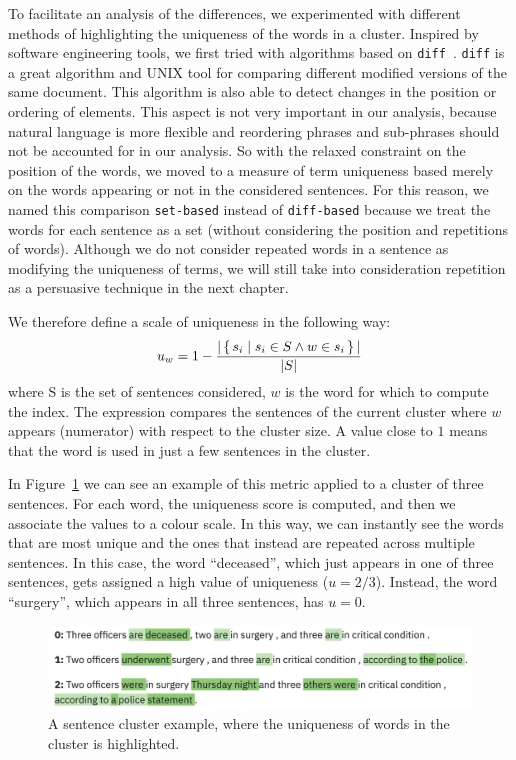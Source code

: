 To facilitate an analysis of the differences, we experimented with different methods of highlighting the uniqueness of the words in a cluster.
Inspired by software engineering tools, we first tried with algorithms based on \texttt{diff}~\citep{myers1986ano}.
\texttt{diff} is a great algorithm and UNIX tool for comparing different modified versions of the same document.
This algorithm is also able to detect changes in the position or ordering of elements. This aspect is not very important in our analysis, because natural language is more flexible and reordering phrases and sub-phrases should not be accounted for in our analysis. So with the relaxed constraint on the position of the words, we moved to a measure of term uniqueness based merely on the words appearing or not in the considered sentences. For this reason, we named this comparison \texttt{set-based} instead of \texttt{diff-based} because we treat the words for each sentence as a set (without considering the position and repetitions of words).
Although we do not consider repeated words in a sentence as modifying the uniqueness of terms, we will still take into consideration repetition as a persuasive technique in the next chapter.

We therefore define a scale of uniqueness in the following way:
$$u_w = 1 - \frac{|\set{s_i | s_i \in S \land w \in s_i}|}{|S|}$$
where S is the set of sentences considered, $w$ is the word for which to compute the index. The expression compares the sentences of the current cluster where $w$ appears (numerator) with respect to the cluster size.
A value close to $1$ means that the word is used in just a few sentences in the cluster.

In Figure~\ref{fig:words_uniqueness} we can see an example of this metric applied to a cluster of three sentences.
For each word, the uniqueness score is computed, and then we associate the values to a colour scale.
In this way, we can instantly see the words that are most unique and the ones that instead are repeated across multiple sentences.
In this case, the word ``deceased'', which just appears in one of three sentences, gets assigned a high value of uniqueness ($u = 2/3$). Instead, the word ``surgery'', which appears in all three sentences, has $u = 0$.

\begin{figure}[!htb]
    \centering
    \includegraphics[width=\textwidth]{figures/words_uniqueness.png}
    \caption{A sentence cluster example, where the uniqueness of words in the cluster is highlighted.}
    \label{fig:words_uniqueness}
\end{figure}


